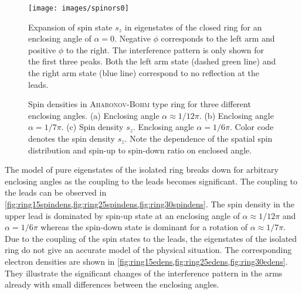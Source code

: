 \begin{figure}[t]
  \centering
  \texttt{[image: images/spinors0]}
  \caption{Expansion of spin state $s_z$ in eigenstates of the closed ring for an enclosing angle of $\alpha = 0$. Negative $\phi$ corresponds to the left arm and positive $\phi$ to the right. The interference pattern is only shown for the first three peaks. Both the left arm state (dashed green line) and the right arm state (blue line) correspond to no reflection at the leads.}\label{fig:spinors0}
\end{figure}
\begin{figure}[b!]
  \caption{Spin densities in \textsc{Aharonov-Bohm} type ring for three different enclosing angles. (a) Enclosing angle $\alpha\approx 1/12 \pi$. (b) Enclosing angle $\alpha=1/7\pi$. (c) Spin density $s_z$. Enclosing angle $\alpha=1/6\pi$. Color code denotes the spin density $s_z$. Note the dependence of the spatial spin distribution and spin-up to spin-down ratio on enclosed angle.}
\end{figure}
The model of pure eigenstates of the isolated ring breaks down for arbitrary enclosing angles as the coupling to the leads becomes significant. The coupling to the leads can be observed in \cref{fig:ring15spindens,fig:ring25spindens,fig:ring30spindens}. The spin density in the upper lead is dominated by spin-up state at an enclosing angle of $\alpha\approx 1/12\pi$ and $\alpha= 1/6\pi$ whereas the spin-down state is dominant for a rotation of $\alpha\approx 1/7\pi$. Due to the coupling of the spin states to the leads, the eigenstates of the isolated ring do not give an accurate model of the physical situation. The corresponding electron densities are shown in \cref{fig:ring15edens,fig:ring25edens,fig:ring30edens}. They illustrate the significant changes of the interference pattern in the arms already with small differences between the enclosing angles.\par 
